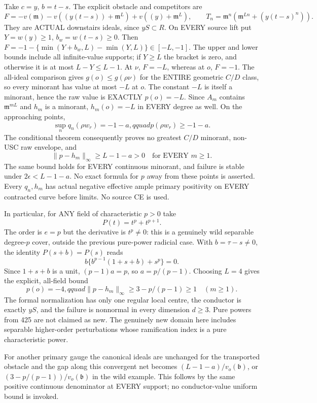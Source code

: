 \documentclass[11pt]{article}
\begin{document}
Take $c=y$, $b=t-s$. The explicit obstacle and competitors are
\[
 F=-v(\mathfrak m)-v((y(t-s))+\mathfrak m^L)
       +v((y)+\mathfrak m^L),
 \qquad T_n=\mathfrak m^n(\mathfrak m^{Ln}+(y(t-s)^n)).
\]
They are ACTUAL downstairs ideals, since $yS\subset R$.
On EVERY source lift put $Y=w(y)\ge1$, $b_w=w(t-s)\ge0$.
Then $F=-1-\{\min(Y+b_w,L)-\min(Y,L)\}\in[-L,-1]$.
The upper and lower bounds include all infinite-value supports; if
$Y\ge L$ the bracket is zero, and otherwise it is at most $L-Y\le L-1$.
At $\nu$, $F=-L$, whereas at $o$, $F=-1$.
The all-ideal comparison gives $g(o)\le g(\rho\nu)$ for the ENTIRE
geometric $C/D$ class, so every minorant has value at most $-L$ at $o$.
The constant $-L$ is itself a minorant, hence the raw value is EXACTLY
$p(o)=-L$. Since $A_m$ contains $\mathfrak m^{mL}$ and $h_m$ is a minorant,
$h_m(o)=-L$ in EVERY degree as well. On the approaching points,
\[
 \sup_n q_n(\rho w_r)=-1-a,qquad p(\rho w_r)\ge-1-a.
\]
The conditional theorem consequently proves no greatest $C/D$ minorant,
non-USC raw envelope, and
\[
 \|p-h_m\|_\infty\ge L-1-a>0\quad\text{for EVERY }m\ge1.
\]
The same bound holds for EVERY continuous minorant, and failure is stable
under $2\epsilon<L-1-a$. No exact formula for $p$ away from these points
is asserted. Every $q_n,h_m$ has actual negative effective ample primary
positivity on EVERY contracted curve before limits. No source CE is used.

In particular, for ANY field of characteristic $p>0$ take
\[
 P(t)=t^p+t^{p+1}.
\]
The order is $e=p$ but the derivative is $t^p\ne0$: this is a genuinely
wild separable degree-$p$ cover, outside the previous pure-power radicial
case. With $b=\tau-s\ne0$, the identity $P(s+b)=P(s)$ reads
\[
 b\{b^{p-1}(1+s+b)+s^p\}=0.
\]
Since $1+s+b$ is a unit, $(p-1)a=p$, so $a=p/(p-1)$.
Choosing $L=4$ gives the explicit, all-field bound
\[
 p(o)=-4,qquad
 \|p-h_m\|_\infty\ge 3-p/(p-1)\ge1\quad(m\ge1).
\]
The formal normalization has only one regular local centre, the conductor
is exactly $yS$, and the failure is nonnormal in every dimension $d\ge3$.
Pure powers from 425 are not claimed as new. The genuinely new domain
here includes separable higher-order perturbations whose ramification
index is a pure characteristic power.

For another primary gauge the canonical ideals are unchanged for the
transported obstacle and the gap along this convergent net becomes
$(L-1-a)/v_o(\mathfrak b)$, or $(3-p/(p-1))/v_o(\mathfrak b)$ in the
wild example. This follows by the same positive continuous denominator
at EVERY support; no conductor-value uniform bound is invoked.
\end{document}
